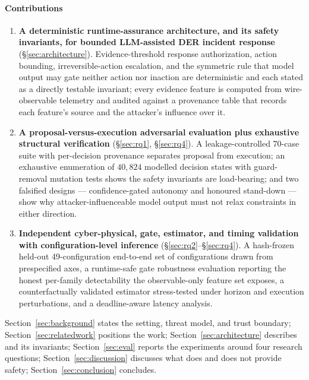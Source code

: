 \paragraph{Contributions}
\begin{enumerate}
  \item \textbf{A deterministic runtime-assurance architecture, and its
    safety invariants, for bounded LLM-assisted DER incident response}
    (\S\ref{sec:architecture}). Evidence-threshold response authorization, action
    bounding, irreversible-action escalation, and the symmetric rule that model
    output may gate neither action nor inaction are deterministic and each
    stated as a directly testable invariant; every evidence feature is
    computed from wire-observable telemetry and audited against a provenance
    table that records each feature's source and the attacker's influence
    over it.
  \item \textbf{A proposal-versus-execution adversarial evaluation plus
    exhaustive structural verification} (\S\ref{sec:rq1}, \S\ref{sec:rq4}). A
    leakage-controlled 70-case suite with per-decision provenance separates
    proposal from execution; an exhaustive enumeration of $40{,}824$ modelled
    decision states with guard-removal mutation tests shows the safety
    invariants are load-bearing; and two falsified designs ---
    confidence-gated autonomy and honoured stand-down --- show why
    attacker-influenceable model output must not relax constraints in either
    direction.
  \item \textbf{Independent cyber-physical, gate, estimator, and timing
    validation with configuration-level inference}
    (\S\ref{sec:rq2}--\S\ref{sec:rq4}). A hash-frozen held-out 49-configuration end-to-end set of
    configurations drawn from prespecified axes, a runtime-safe gate robustness
    evaluation reporting the honest per-family detectability the observable-only
    feature set exposes, a counterfactually validated estimator
    stress-tested under horizon and execution perturbations, and a
    deadline-aware latency analysis.
\end{enumerate}

Section~\ref{sec:background} states the setting, threat model, and trust
boundary; Section~\ref{sec:relatedwork} positions the work;
Section~\ref{sec:architecture} describes \ours{} and its invariants;
Section~\ref{sec:eval} reports the experiments around four research
questions; Section~\ref{sec:discussion} discusses what does and does not
provide safety; Section~\ref{sec:conclusion} concludes.
